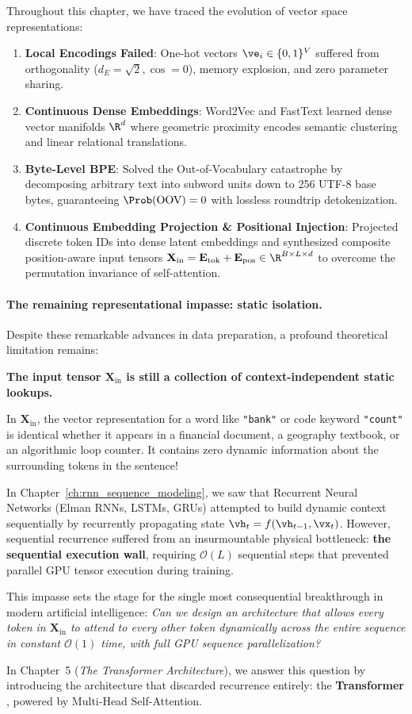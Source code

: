 \documentclass[../../main.tex]{subfiles}
\begin{document}
Throughout this chapter, we have traced the evolution of vector space representations:
\begin{enumerate}
    \item \textbf{Local Encodings Failed}: One-hot vectors $\ve_i \in \{0, 1\}^V$ suffered from orthogonality ($d_E = \sqrt{2}, \cos = 0$), memory explosion, and zero parameter sharing.
    \item \textbf{Continuous Dense Embeddings}: Word2Vec and FastText learned dense vector manifolds $\R^d$ where geometric proximity encodes semantic clustering and linear relational translations.
    \item \textbf{Byte-Level BPE}: Solved the Out-of-Vocabulary catastrophe by decomposing arbitrary text into subword units down to 256 UTF-8 base bytes, guaranteeing $\Prob(\text{OOV}) = 0$ with lossless roundtrip detokenization.
    \item \textbf{Continuous Embedding Projection \& Positional Injection}: Projected discrete token IDs into dense latent embeddings and synthesized composite position-aware input tensors $\mathbf{X}_{\text{in}} = \mathbf{E}_{\text{tok}} + \mathbf{E}_{\text{pos}} \in \R^{B \times L \times d}$ to overcome the permutation invariance of self-attention.
\end{enumerate}

\paragraph{The remaining representational impasse: static isolation.}
Despite these remarkable advances in data preparation, a profound theoretical limitation remains:
\begin{center}
\textbf{The input tensor $\mathbf{X}_{\text{in}}$ is still a collection of context-independent static lookups.}
\end{center}
In $\mathbf{X}_{\text{in}}$, the vector representation for a word like \texttt{"bank"} or code keyword \texttt{"count"} is identical whether it appears in a financial document, a geography textbook, or an algorithmic loop counter. It contains zero dynamic information about the surrounding tokens in the sentence!

In Chapter~\ref{ch:rnn_sequence_modeling}, we saw that Recurrent Neural Networks (Elman RNNs, LSTMs, GRUs) attempted to build dynamic context sequentially by recurrently propagating state $\vh_t = f(\vh_{t-1}, \vx_t)$. However, sequential recurrence suffered from an insurmountable physical bottleneck: \textbf{the sequential execution wall}, requiring $\mathcal{O}(L)$ sequential steps that prevented parallel GPU tensor execution during training.

This impasse sets the stage for the single most consequential breakthrough in modern artificial intelligence: \emph{Can we design an architecture that allows every token in $\mathbf{X}_{\text{in}}$ to attend to every other token dynamically across the entire sequence in constant $\mathcal{O}(1)$ time, with full GPU sequence parallelization?}

In Chapter~5 (\emph{The Transformer Architecture}), we answer this question by introducing the architecture that discarded recurrence entirely: the \textbf{Transformer} \cite{vaswani2017}, powered by Multi-Head Self-Attention.
\end{document}

